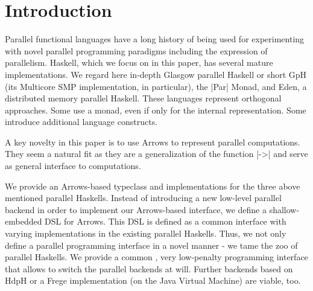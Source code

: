 
\section{Introduction}
\label{sec:introduction}
%
%
%

Parallel functional languages have a long history of being used for experimenting with novel parallel programming paradigms including the expression of parallelism. Haskell, which we focus on in this paper, has  several mature implementations. We regard here in-depth
Glasgow parallel Haskell or short GpH (its Multicore SMP implementation, in particular), the
|Par| Monad, and Eden, a distributed memory parallel Haskell. These
languages represent orthogonal approaches. Some use a monad, even if
only for the internal representation. Some introduce additional
language constructs.

A key novelty in this paper is to use Arrows to represent parallel computations. They seem a natural fit as they are a generalization of the function |->| and serve as general interface to computations.

We provide an Arrows-based typeclass and implementations for the three above mentioned parallel Haskells.
Instead of 
introducing a new low-level parallel backend in order to implement our
Arrows-based interface, we define a shallow-embedded DSL for Arrows. This DSL
is defined as a common interface with varying implementations in
the existing parallel Haskells. Thus, we not only define a parallel programming interface in a
novel manner - we tame the zoo of parallel Haskells. We provide a
common , very low-penalty programming interface that allows to switch
the parallel backends at will. Further backends based on HdpH or a Frege implementation (on the Java Virtual Machine) are viable, too.

